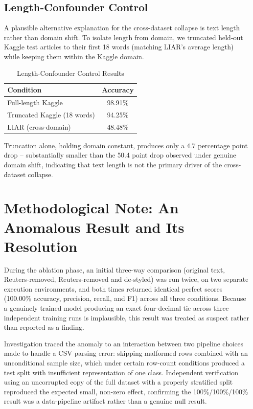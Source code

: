 \documentclass[conference]{IEEEtran}
\begin{document}
\subsection{Length-Confounder Control}
A plausible alternative explanation for the cross-dataset collapse is text length rather than domain shift. To isolate length from domain, we truncated held-out Kaggle test articles to their first 18 words (matching LIAR's average length) while keeping them within the Kaggle domain.

\begin{table}[!t]
\caption{Length-Confounder Control Results}
\centering
\begin{tabular}{lc}
\toprule
Condition & Accuracy \\
\midrule
Full-length Kaggle & 98.91\% \\
Truncated Kaggle (18 words) & 94.25\% \\
LIAR (cross-domain) & 48.48\% \\
\bottomrule
\end{tabular}
\end{table}

Truncation alone, holding domain constant, produces only a 4.7 percentage point drop -- substantially smaller than the 50.4 point drop observed under genuine domain shift, indicating that text length is not the primary driver of the cross-dataset collapse.

\section{Methodological Note: An Anomalous Result and Its Resolution}
During the ablation phase, an initial three-way comparison (original text, Reuters-removed, Reuters-removed and de-styled) was run twice, on two separate execution environments, and both times returned identical perfect scores (100.00\% accuracy, precision, recall, and F1) across all three conditions. Because a genuinely trained model producing an exact four-decimal tie across three independent training runs is implausible, this result was treated as suspect rather than reported as a finding.

Investigation traced the anomaly to an interaction between two pipeline choices made to handle a CSV parsing error: skipping malformed rows combined with an unconditional sample size, which under certain row-count conditions produced a test split with insufficient representation of one class. Independent verification using an uncorrupted copy of the full dataset with a properly stratified split reproduced the expected small, non-zero effect, confirming the 100\%/100\%/100\% result was a data-pipeline artifact rather than a genuine null result.
\end{document}
